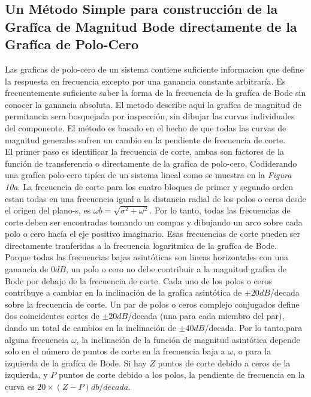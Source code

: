 \documentclass[10pt,a4paper]{article}
\begin{document}
\subsection{Un Método Simple para construcción de la Grafíca de Magnitud Bode directamente de la Grafíca de Polo-Cero}
Las graficas de polo-cero de un sistema contiene suficiente informacion que define la respuesta en frecuencia excepto por una ganancia constante arbitraría. Es frecuentemente suficiente saber la forma de la frecuencia de la grafíca de Bode sin conocer la ganancia absoluta. El metodo describe aqui la grafíca de magnitud de permitancia sera bosquejada por inspección, sin dibujar las curvas individuales del componente. El método es basado en el hecho de que todas las curvas de magnitud  generales sufren un cambio en la pendiente de frecuencia de corte.\\
El primer paso es identificar la frecuencia de corte, ambas son factores de la función de transferencia o directamente de la grafíca de polo-cero, Codiderando una grafíca polo-cero tipíca de un sistema lineal como se muestra en la \textit{Figura 10a}. La frecuencia de corte para los cuatro bloques de primer y segundo orden estan todas en una frecuencia igual a la distancia radial de los polos o ceros desde el origen del plano-s, es $\omega{\scriptscriptstyle b}=\sqrt{\sigma^{2}+\omega^{2}}$.
Por lo tanto, todas las frecuencias de corte deben ser encontradas tomando un compas y dibujando un arco sobre cada polo o cero hacía el eje positivo imaginario. Esas frecuencias de corte pueden ser directamente tranferidas a la frecuencia logaritmica de la grafíca de Bode.\\
Porque todas las frecuencias bajas asintóticas son lineas horizontales con una ganancia de $0dB$, un polo o cero no debe contribuir a la magnitud grafíca de Bode por debajo de la frecuencia de corte. Cada uno de los polos o ceros contribuye a cambiar en la inclinación de la grafíca asintótica de $\pm20dB$/decada sobre la frecuencia de corte. Un par de polos o ceros complejo conjugados define dos coincidentes cortes de $\pm20dB$/decada (una para cada miembro del par), dando un total de cambios en la inclinación de $\pm40dB$/decada. Por lo tanto,para alguna frecuencia $\omega$, la inclinación de la función de magnitud asintótica depende solo en el número de puntos de corte en la frecuencia baja a $\omega$, o para la izquierda de la grafíca de Bode. Si hay $Z$ puntos de corte debido a ceros de la izquierda, y $P$ puntos de corte debido a los polos, la pendiente de frecuencia en la curva es  $20\times(Z-P)db/decada$.\\
\end{document}
